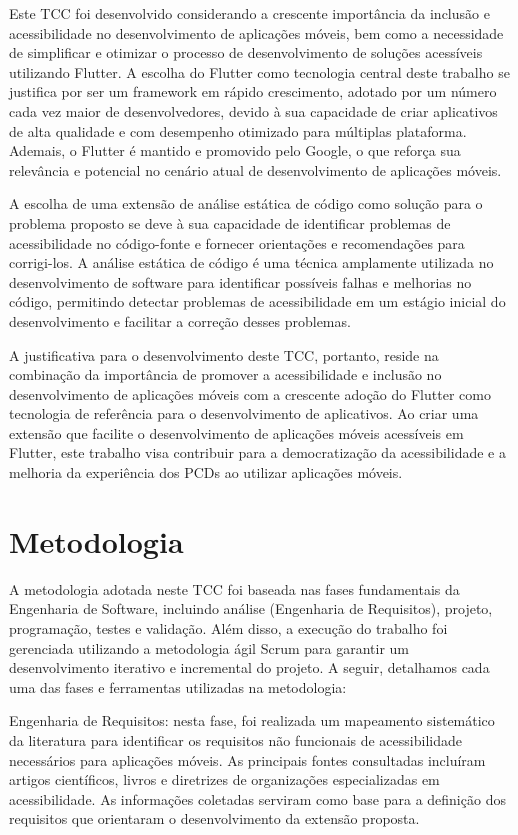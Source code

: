 Este TCC foi desenvolvido considerando a crescente importância da inclusão e acessibilidade no desenvolvimento de aplicações móveis, bem como a necessidade de simplificar e otimizar o processo de desenvolvimento de soluções acessíveis utilizando Flutter. A escolha do Flutter como tecnologia central deste trabalho se justifica por ser um framework em rápido crescimento, adotado por um número cada vez maior de desenvolvedores, devido à sua capacidade de criar aplicativos de alta qualidade e com desempenho otimizado para múltiplas plataforma. Ademais, o Flutter é mantido e promovido pelo Google, o que reforça sua relevância e potencial no cenário atual de desenvolvimento de aplicações móveis.

A escolha de uma extensão de análise estática de código como solução para o problema proposto se deve à sua capacidade de identificar problemas de acessibilidade no código-fonte e fornecer orientações e recomendações para corrigi-los. A análise estática de código é uma técnica amplamente utilizada no desenvolvimento de software para identificar possíveis falhas e melhorias no código, permitindo detectar problemas de acessibilidade em um estágio inicial do desenvolvimento e facilitar a correção desses problemas.

A justificativa para o desenvolvimento deste TCC, portanto, reside na combinação da importância de promover a acessibilidade e inclusão no desenvolvimento de aplicações móveis com a crescente adoção do Flutter como tecnologia de referência para o desenvolvimento de aplicativos. Ao criar uma extensão que facilite o desenvolvimento de aplicações móveis acessíveis em Flutter, este trabalho visa contribuir para a democratização da acessibilidade e a melhoria da experiência dos PCDs ao utilizar aplicações móveis.

\section{Metodologia}

A metodologia adotada neste TCC foi baseada nas fases fundamentais da Engenharia de Software, incluindo análise (Engenharia de Requisitos), projeto, programação, testes e validação. Além disso, a execução do trabalho foi gerenciada utilizando a metodologia ágil Scrum para garantir um desenvolvimento iterativo e incremental do projeto. A seguir, detalhamos cada uma das fases e ferramentas utilizadas na metodologia:

Engenharia de Requisitos: nesta fase, foi realizada um mapeamento sistemático da literatura para identificar os requisitos não funcionais de acessibilidade necessários para aplicações móveis. As principais fontes consultadas incluíram artigos científicos, livros e diretrizes de organizações especializadas em acessibilidade. As informações coletadas serviram como base para a definição dos requisitos que orientaram o desenvolvimento da extensão proposta.

